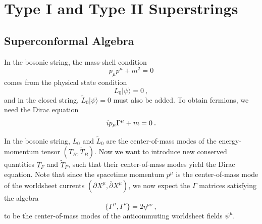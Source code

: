 \setcounter{section}{0}%
\setcounter{chapter}{9}
\chapter{\texorpdfstring{Type I and Type II Superstrings}{10 Type I and Type II Superstrings}} \label{cha:10}


\section{Superconformal Algebra}

In the bosonic string, the mass-shell condition
\begin{equation}
	p_{\mu}p^{\mu}+m^{2}=0 \label{10.1.1}
\end{equation}
comes from the physical state condition
\begin{equation}
	L_{0}\lvert \psi\rangle = 0\: , \label{10.1.2}
\end{equation}
and in the closed string, $\tilde{L}_{0}\lvert\psi\rangle=0$ must also be added. To obtain fermions, we need the Dirac equation
\begin{equation}
	i p_{\mu} \Gamma^{\mu}+m=0\:. \label{10.1.3}
\end{equation}

In the bosonic string, $L_{0}$ and $\tilde{L}_{0}$ are the center-of-mass modes of the energy-momentum tensor $(T_{B},\tilde{T}_{B})$. Now we want to introduce new conserved quantities $T_{F}$ and $\tilde{T}_{F}$, such that their center-of-mass modes yield the Dirac equation. Note that since the spacetime momentum $p^{\mu}$ is the center-of-mass mode of the worldsheet currents $(\partial X^{\mu},\bar{\partial}X^{\mu})$, we now expect the $\Gamma$ matrices satisfying the algebra
\begin{equation}
	\{\Gamma^{\mu},\Gamma^{\nu}\}=2\eta^{\mu\nu} \:, \label{10.1.4}
\end{equation}
to be the center-of-mass modes of the anticommuting worldsheet fields $\psi^{\mu}$.

